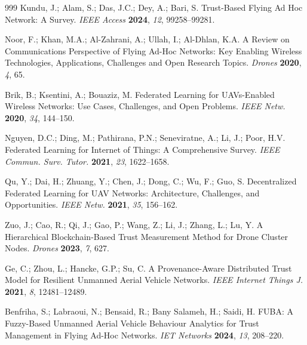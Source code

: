 \documentclass[notspecified,article,submit,moreauthors]{Definitions/mdpi}
\begin{document}



\begin{thebibliography}{999}
Kundu, J.; Alam, S.; Das, J.C.; Dey, A.; Bari, S. Trust-Based Flying Ad Hoc Network: A Survey. {\em IEEE Access} {\bf 2024}, {\em 12}, 99258--99281.

Noor, F.; Khan, M.A.; Al-Zahrani, A.; Ullah, I.; Al-Dhlan, K.A. A Review on Communications Perspective of Flying Ad-Hoc Networks: Key Enabling Wireless Technologies, Applications, Challenges and Open Research Topics. {\em Drones} {\bf 2020}, {\em 4}, 65.

Brik, B.; Ksentini, A.; Bouaziz, M. Federated Learning for UAVs-Enabled Wireless Networks: Use Cases, Challenges, and Open Problems. {\em IEEE Netw.} {\bf 2020}, {\em 34}, 144--150.

Nguyen, D.C.; Ding, M.; Pathirana, P.N.; Seneviratne, A.; Li, J.; Poor, H.V. Federated Learning for Internet of Things: A Comprehensive Survey. {\em IEEE Commun. Surv. Tutor.} {\bf 2021}, {\em 23}, 1622--1658.

Qu, Y.; Dai, H.; Zhuang, Y.; Chen, J.; Dong, C.; Wu, F.; Guo, S. Decentralized Federated Learning for UAV Networks: Architecture, Challenges, and Opportunities. {\em IEEE Netw.} {\bf 2021}, {\em 35}, 156--162.

Zuo, J.; Cao, R.; Qi, J.; Gao, P.; Wang, Z.; Li, J.; Zhang, L.; Lu, Y. A Hierarchical Blockchain-Based Trust Measurement Method for Drone Cluster Nodes. {\em Drones} {\bf 2023}, {\em 7}, 627.

Ge, C.; Zhou, L.; Hancke, G.P.; Su, C. A Provenance-Aware Distributed Trust Model for Resilient Unmanned Aerial Vehicle Networks. {\em IEEE Internet Things J.} {\bf 2021}, {\em 8}, 12481--12489.

Benfriha, S.; Labraoui, N.; Bensaid, R.; Bany Salameh, H.; Saidi, H. FUBA: A Fuzzy-Based Unmanned Aerial Vehicle Behaviour Analytics for Trust Management in Flying Ad-Hoc Networks. {\em IET Networks} {\bf 2024}, {\em 13}, 208--220.


\end{thebibliography}
\end{document}
